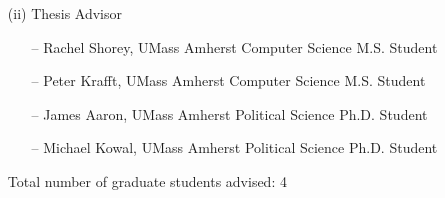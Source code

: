 \begin{enumerate}
\begin{enumerate}
\item[(ii)] Thesis Advisor
\begin{enumerate}
\item[--] Rachel Shorey, UMass Amherst Computer Science M.S. Student
\item[--] Peter Krafft, UMass Amherst Computer Science M.S. Student
\item[--] James Aaron, UMass Amherst Political Science Ph.D. Student
\item[--] Michael Kowal, UMass Amherst Political Science Ph.D. Student
\end{enumerate}
Total number of graduate students advised: 4

\end{enumerate}
\end{enumerate}

